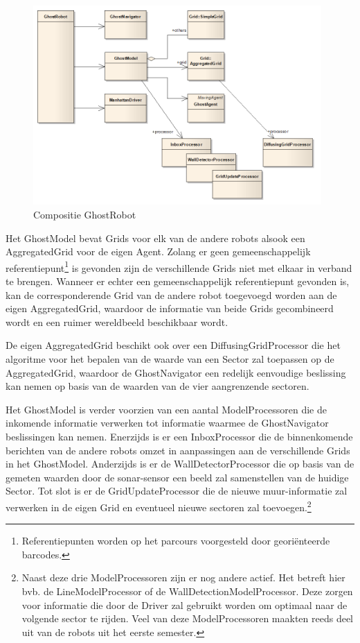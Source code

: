 \documentclass[12pt,a4paper]{report}
\begin{document}
\begin{figure}[htbp]
  \centering
  \includegraphics[width=110mm]{resources/ghostrobot.png}
  \caption{Compositie GhostRobot}
  \label{uml:ghostrobot}
\end{figure}

Het GhostModel bevat Grids voor elk van de andere robots alsook een AggregatedGrid voor de eigen Agent. Zolang er geen gemeenschappelijk referentiepunt\footnote{Referentiepunten worden op het parcours voorgesteld door geori\"enteerde barcodes.} is gevonden zijn de verschillende Grids niet met elkaar in verband te brengen. Wanneer er echter een gemeenschappelijk referentiepunt gevonden is, kan de corresponderende Grid van de andere robot toegevoegd worden aan de eigen AggregatedGrid, waardoor de informatie van beide Grids gecombineerd wordt en een ruimer wereldbeeld beschikbaar wordt.

De eigen AggregatedGrid beschikt ook over een DiffusingGridProcessor die het algoritme voor het bepalen van de waarde van een Sector zal toepassen op de AggregatedGrid, waardoor de GhostNavigator een redelijk eenvoudige beslissing kan nemen op basis van de waarden van de vier aangrenzende sectoren.

Het GhostModel is verder voorzien van een aantal ModelProcessoren die de inkomende informatie verwerken tot informatie waarmee de GhostNavigator beslissingen kan nemen. Enerzijds is er een InboxProcessor die de binnenkomende berichten van de andere robots omzet in aanpassingen aan de verschillende Grids in het GhostModel. Anderzijds is er de WallDetectorProcessor die op basis van de gemeten waarden door de sonar-sensor een beeld zal samenstellen van de huidige Sector. Tot slot is er de GridUpdateProcessor die de nieuwe muur-informatie zal verwerken in de eigen Grid en eventueel nieuwe sectoren zal toevoegen.\footnote{Naast deze drie ModelProcessoren zijn er nog andere actief. Het betreft hier bvb. de LineModelProcessor of de WallDetectionModelProcessor. Deze zorgen voor informatie die door de Driver zal gebruikt worden om optimaal naar de volgende sector te rijden. Veel van deze ModelProcessoren maakten reeds deel uit van de robots uit het eerste semester.}
\end{document}

